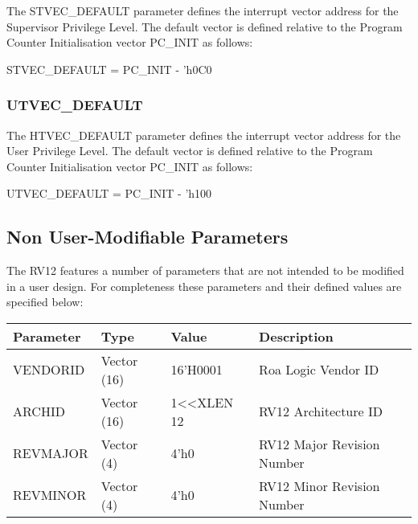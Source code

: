 The STVEC\_DEFAULT parameter defines the interrupt vector address for
the Supervisor Privilege Level. The default vector is defined relative
to the Program Counter Initialisation vector PC\_INIT as follows:

STVEC\_DEFAULT = PC\_INIT - 'h0C0

\subsubsection{UTVEC\_DEFAULT}\label{utvec_default}

The HTVEC\_DEFAULT parameter defines the interrupt vector address for
the User Privilege Level. The default vector is defined relative to the
Program Counter Initialisation vector PC\_INIT as follows:

UTVEC\_DEFAULT = PC\_INIT - 'h100

\subsection{Non User-Modifiable
Parameters}\label{non-user-modifiable-parameters}

The RV12 features a number of parameters that are not intended to be
modified in a user design. For completeness these parameters and their
defined values are specified below:

\begin{longtable}[]{@{}llll@{}}
\toprule
Parameter & Type & Value & Description\tabularnewline
\midrule
\endhead
VENDORID & Vector (16) & 16'H0001 & Roa Logic Vendor ID\tabularnewline
ARCHID & Vector (16) & 1\textless{}\textless{}XLEN \textbar{} 12 & RV12
Architecture ID\tabularnewline
REVMAJOR & Vector (4) & 4'h0 & RV12 Major Revision Number\tabularnewline
REVMINOR & Vector (4) & 4'h0 & RV12 Minor Revision Number\tabularnewline
\bottomrule
\end{longtable}